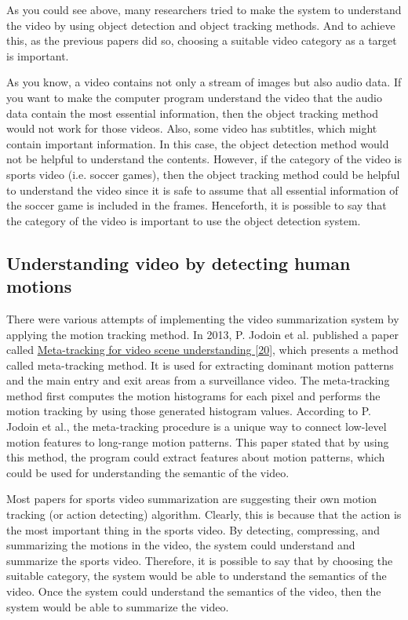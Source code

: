 \documentclass{article}
\begin{document}
As you could see above, many researchers tried to make the system to understand the video by using object detection and object tracking methods. And to achieve this, as the previous papers did so, choosing a suitable video category as a target is important.

As you know, a video contains not only a stream of images but also audio data. If you want to make the computer program understand the video that the audio data contain the most essential information, then the object tracking method would not work for those videos. Also, some video has subtitles, which might contain important information. In this case, the object detection method would not be helpful to understand the contents. However, if the category of the video is sports video (i.e. soccer games), then the object tracking method could be helpful to understand the video since it is safe to assume that all essential information of the soccer game is included in the frames. Henceforth, it is possible to say that the category of the video is important to use the object detection system.

\subsection{Understanding video by detecting human motions}

There were various attempts of implementing the video summarization system by applying the motion tracking method. In 2013, P. Jodoin et al. published a paper called \hyperlink{ref20}{Meta-tracking for video scene understanding [20]}, which presents a method called meta-tracking method. It is used for extracting dominant motion patterns and the main entry and exit areas from a surveillance video. The meta-tracking method first computes the motion histograms for each pixel and performs the motion tracking by using those generated histogram values. According to P. Jodoin et al., the meta-tracking procedure is a unique way to connect low-level motion features to long-range motion patterns. This paper stated that by using this method, the program could extract features about motion patterns, which could be used for understanding the semantic of the video.

Most papers for sports video summarization are suggesting their own motion tracking (or action detecting) algorithm. Clearly, this is because that the action is the most important thing in the sports video. By detecting, compressing, and summarizing the motions in the video, the system could understand and summarize the sports video. Therefore, it is possible to say that by choosing the suitable category, the system would be able to understand the semantics of the video. Once the system could understand the semantics of the video, then the system would be able to summarize the video.
\end{document}
